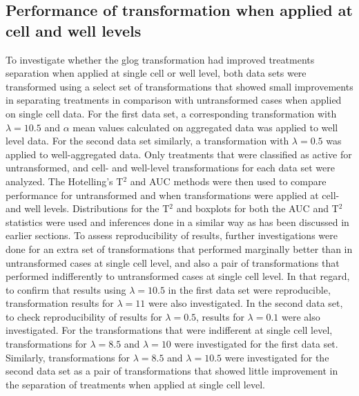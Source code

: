 \documentclass[11pt]{article}
\begin{document}
\subsection{Performance of transformation when applied at cell and well levels}
\par{To investigate whether the glog transformation had improved treatments separation when applied at single cell or well level, both data sets were transformed using a select set of transformations that showed small improvements in separating treatments in comparison with untransformed cases when applied on single cell data. For the first data set, a corresponding transformation with $\lambda = 10.5$ and $\alpha$ mean values calculated on aggregated data was applied to well level data. For the second data set similarly, a transformation with $\lambda = 0.5$ was applied to well-aggregated data. Only treatments that were classified as active for untransformed, and cell- and well-level transformations for each data set were analyzed. The Hotelling's T$^2$ and AUC methods were then used to compare performance for untransformed and when transformations were applied at cell- and well levels. Distributions for the T$^2$ and boxplots for both the AUC and T$^2$ statistics were used and inferences done in a similar way as has been discussed in earlier sections. To assess reproducibility of results, further investigations were done for an extra set of transformations that performed marginally better than in untransformed cases at single cell level, and also a pair of transformations that performed indifferently to untransformed cases at single cell level. In that regard, to confirm that results using $\lambda = 10.5$ in the first data set were reproducible, transformation results for $\lambda = 11$ were also investigated. In the second data set, to check reproducibility of results for $\lambda = 0.5$, results for $\lambda = 0.1$ were also investigated. For the transformations that were indifferent at single cell level, transformations for $\lambda = 8.5$ and $\lambda = 10$  were investigated for the first data set. Similarly, transformations for $\lambda = 8.5$ and $\lambda = 10.5$ were investigated for the second data set as a pair of transformations that showed little improvement in the separation of treatments when applied at single cell level.}
\end{document}
